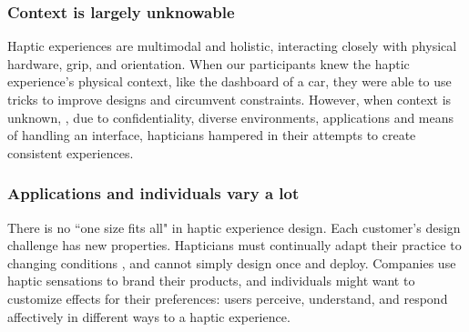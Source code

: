     \subsubsection{Context is largely unknowable}
    \noindent
    Haptic experiences are multimodal and holistic, %
     interacting closely with physical hardware, grip, and orientation.
    When our participants knew the haptic experience's physical context, like the dashboard of a car,
   they were able to use tricks to improve designs and circumvent constraints. %
    However, when context is unknown, \eg, due to confidentiality, %
    diverse environments, applications and means of handling an interface, %
    hapticians  hampered in their attempts %
    to create consistent experiences.
    
    \subsubsection{Applications and individuals vary a lot}
    \noindent
    There is no ``one size fits all" in haptic experience design.
    Each customer's design challenge has new properties.
    Hapticians must continually adapt their practice to changing conditions \citep{Schon1982}, and cannot simply design once and deploy.
    Companies use haptic sensations to brand their products, and individuals might want to customize effects for their preferences:
    users perceive, understand, and respond affectively in different ways to a haptic experience.
    
